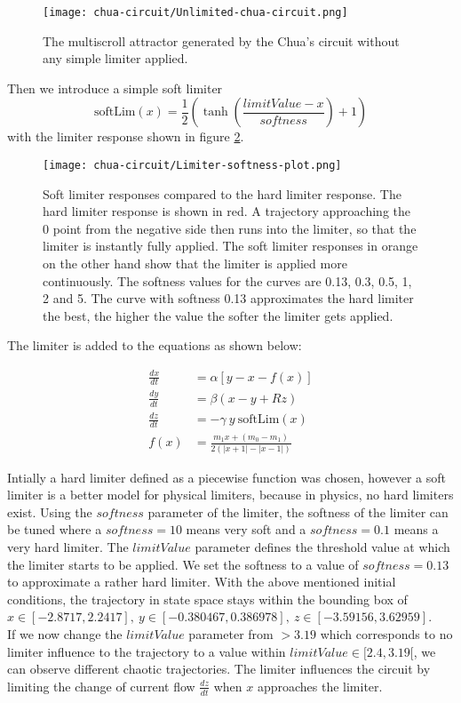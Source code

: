 \documentclass[main]{subfiles}
\begin{document}
\begin{figure}[H]
\centering
\texttt{[image: chua-circuit/Unlimited-chua-circuit.png]}
\caption[The multiscroll attractor]{The multiscroll attractor generated by the Chua's circuit without any simple limiter applied.}
\label{figure:chaoticchuacircuit}
\end{figure}

Then we introduce a simple soft limiter \[\text{softLim}(x) = \frac{1}{2} \left(\tanh\left(\frac{limitValue - x}{softness}\right) + 1\right)\] with the limiter response shown in figure \ref{figure:softlimiterresponse}.

\begin{figure}[H]
\centering
\texttt{[image: chua-circuit/Limiter-softness-plot.png]}
\caption[Soft limiter responses]{Soft limiter responses compared to the hard limiter response. The hard limiter response is shown in red. A trajectory approaching the 0 point from the negative side then runs into the limiter, so that the limiter is instantly fully applied. The soft limiter responses in orange on the other hand show that the limiter is applied more continuously. The softness values for the curves are 0.13, 0.3, 0.5, 1, 2 and 5. The curve with softness 0.13 approximates the hard limiter the best, the higher the value the softer the limiter gets applied. }
\label{figure:softlimiterresponse}
\end{figure}

The limiter is added to the equations as shown below:

\begin{align*}
\frac{dx}{dt}&=\alpha [y-x-f(x)] \\
\frac{dy}{dt}&=\beta (x-y+Rz)\\
\frac{dz}{dt}&=-\gamma ~ y ~ \text{softLim}(x)\\
f (x) &= \frac{m_1 x + (m_0 - m_1)}{2 (| x + 1 | -| x - 1 |)}
\end{align*}

Intially a hard limiter defined as a piecewise function was chosen, however a soft limiter is a better model for physical limiters, because in physics, no hard limiters exist. Using the $softness$ parameter of the limiter, the softness of the limiter can be tuned where a \(softness = 10\) means very soft and a \(softness = 0.1\) means a very hard limiter. The $limitValue$ parameter defines the threshold value at which the limiter starts to be applied. We set the softness to a value of \(softness=0.13\) to approximate a rather hard limiter. With the above mentioned initial conditions, the trajectory in state space stays within the bounding box of \(x \in [-2.8717,2.2417],~y \in [-0.380467,0.386978],~z \in [-3.59156,3.62959]\).\\
If we now change the $limitValue$ parameter from \(>3.19\) which corresponds to no limiter influence to the trajectory to a value within \(limitValue \in [2.4,3.19[\), we can observe different chaotic trajectories. The limiter influences the circuit by limiting the change of current flow \(\frac{dz}{dt}\) when \(x\) approaches the limiter.
\end{document}
